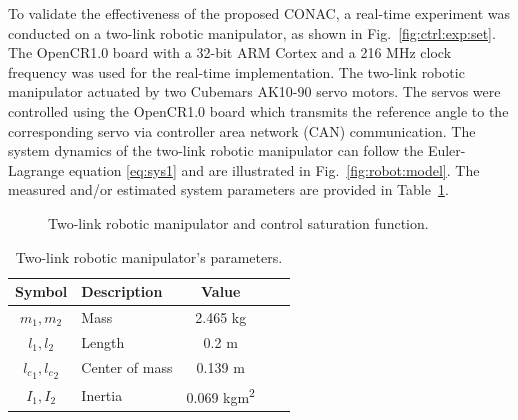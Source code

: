 \documentclass[journal]{IEEEtran}
\begin{document}
To validate the effectiveness of the proposed CONAC, a real-time experiment was conducted on a two-link robotic manipulator, as shown in Fig.~\ref{fig:ctrl:exp:set}. 
The OpenCR1.0 board \cite{opencr} with a 32-bit ARM Cortex and a 216 MHz clock frequency was used for the real-time implementation.
The two-link robotic manipulator actuated by two Cubemars AK10-90 servo motors. 
The servos were controlled using the OpenCR1.0 board which transmits the reference angle to the corresponding servo via controller area network (CAN) communication.
The system dynamics of the two-link robotic manipulator can follow the Euler-Lagrange equation \eqref{eq:sys1} and are illustrated in Fig.~\ref{fig:robot:model}. 
The measured and/or estimated system parameters are provided in Table~\ref{table:system:params}. 

\begin{figure}[t]
    \centering
    \hfill
    \caption{Two-link robotic manipulator and control saturation function.}
    \label{fig:robot}
\end{figure}

\begin{table}[t]
    \renewcommand{\arraystretch}{1.3}
    \caption{Two-link robotic manipulator's parameters.}
    \centering
    \begin{tabular}{c m{9.5em} c c c }
    \hline
    \textbf{Symbol} & \textbf{Description} & \textbf{Value} \\
    \hline
    \hline 
    $m_1,m_2$ & Mass & 2.465 kg \\
    \hline
    $l_1,l_2$  & Length & 0.2 m \\  
    \hline
    ${l_c}_1,{l_c}_2$ & Center of mass & 0.139 m \\
    \hline
    $I_1,I_2$  & Inertia & 0.069 kgm\textsuperscript{2} \\
    \hline
    \end{tabular}
    \label{table:system:params}
\end{table}
\end{document}
